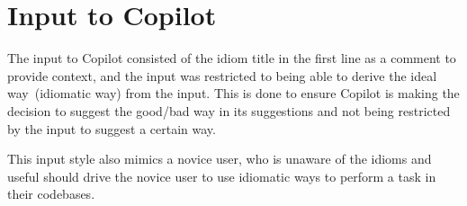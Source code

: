 \section{Input to Copilot}
\label{input}
The input to Copilot consisted of the idiom title in the first line as a comment to provide context, and the input was restricted to being able to derive the ideal way~(idiomatic way) from the input. This is done to ensure Copilot is making the decision to suggest the good/bad way in its suggestions and not being restricted by the input to suggest a certain way. 

This input style also mimics a novice user, who is unaware of the idioms and useful \cct{} should drive the novice user to use idiomatic ways to perform a task in their codebases.